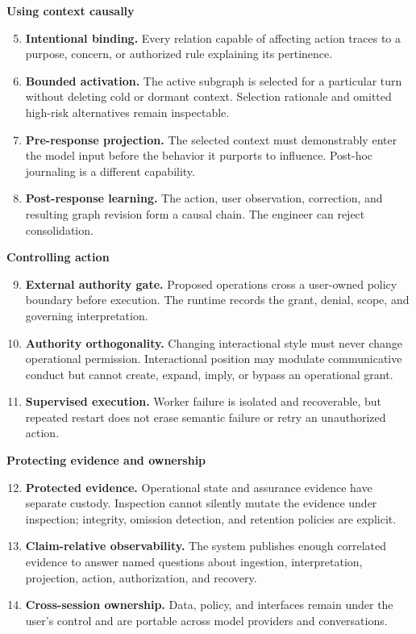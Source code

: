 \documentclass[10pt,a4paper]{article}
\begin{document}
\noindent\textbf{Using context causally}
\begin{enumerate}
  \setcounter{enumi}{4}
  \item \textbf{Intentional binding.} Every relation capable of affecting action traces to a purpose, concern, or authorized rule explaining its pertinence.
  \item \textbf{Bounded activation.} The active subgraph is selected for a particular turn without deleting cold or dormant context. Selection rationale and omitted high-risk alternatives remain inspectable.
  \item \textbf{Pre-response projection.} The selected context must demonstrably enter the model input before the behavior it purports to influence. Post-hoc journaling is a different capability.
  \item \textbf{Post-response learning.} The action, user observation, correction, and resulting graph revision form a causal chain. The engineer can reject consolidation.
\end{enumerate}

\noindent\textbf{Controlling action}
\begin{enumerate}
  \setcounter{enumi}{8}
  \item \textbf{External authority gate.} Proposed operations cross a user-owned policy boundary before execution. The runtime records the grant, denial, scope, and governing interpretation.
  \item \textbf{Authority orthogonality.} Changing interactional style must never change operational permission. Interactional position may modulate communicative conduct but cannot create, expand, imply, or bypass an operational grant.
  \item \textbf{Supervised execution.} Worker failure is isolated and recoverable, but repeated restart does not erase semantic failure or retry an unauthorized action.
\end{enumerate}

\noindent\textbf{Protecting evidence and ownership}
\begin{enumerate}
  \setcounter{enumi}{11}
  \item \textbf{Protected evidence.} Operational state and assurance evidence have separate custody. Inspection cannot silently mutate the evidence under inspection; integrity, omission detection, and retention policies are explicit.
  \item \textbf{Claim-relative observability.} The system publishes enough correlated evidence to answer named questions about ingestion, interpretation, projection, action, authorization, and recovery.
  \item \textbf{Cross-session ownership.} Data, policy, and interfaces remain under the user's control and are portable across model providers and conversations.
\end{enumerate}
\end{document}
